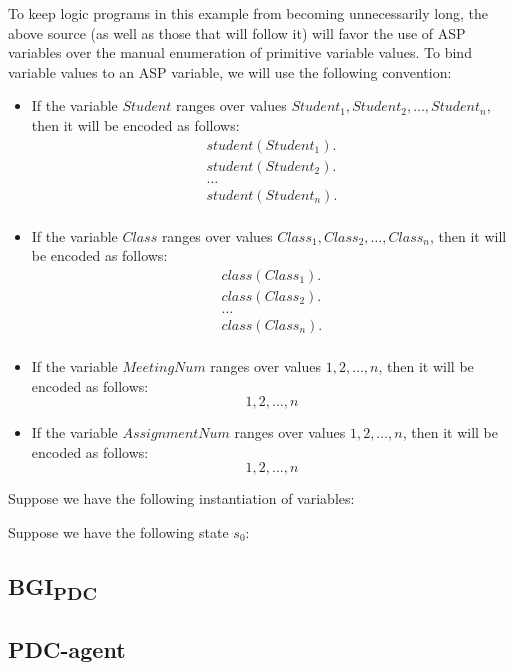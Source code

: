 To keep logic programs in this example from becoming unnecessarily long, the above source (as well as those that will follow it) will favor the use of ASP variables over the manual enumeration of primitive variable values.
To bind variable values to an ASP variable, we will use the following convention:
\begin{itemize}
    \item If the variable $Student$ ranges over values $Student_1, Student_2, \dots, Student_n$, then it will be encoded as follows:
        \begin{gather}
            student(Student_1). \\
            student(Student_2). \\
            \dots \\
            student(Student_n). \\
        \end{gather}
    \item If the variable $Class$ ranges over values $Class_1, Class_2, \dots, Class_n$, then it will be encoded as follows:
        \begin{gather}
            class(Class_1). \\
            class(Class_2). \\
            \dots \\
            class(Class_n). \\
        \end{gather}
    \item If the variable $MeetingNum$ ranges over values $1, 2, \dots, n$, then it will be encoded as follows:
        \begin{equation}
            1, 2, \dots, n
        \end{equation}
    \item If the variable $AssignmentNum$ ranges over values $1, 2, \dots, n$, then it will be encoded as follows:
        \begin{equation}
            1, 2, \dots, n
        \end{equation}
\end{itemize}

Suppose we have the following instantiation of variables:


Suppose we have the following state $s_0$:





\subsection{\texorpdfstring{BGI\textsubscript{PDC}}{BGI-PDC}}

\subsection{PDC-agent}
